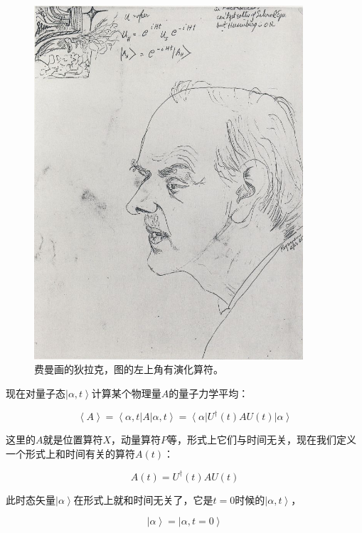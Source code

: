 \begin{figure}[htbp]
\begin{center}
\includegraphics[width=10cm]{Spin/DbyF.jpg}
\caption{费曼画的狄拉克，图的左上角有演化算符。}
\end{center}
\end{figure}

现在对量子态$\left| \alpha, t \right\rangle$计算某个物理量$A$的量子力学平均：

\begin{equation}
\left\langle A \right\rangle = \left\langle \alpha, t \right| A \left| \alpha, t \right\rangle = \left\langle \alpha \right| U^\dagger(t) A U(t) \left| \alpha \right\rangle
\end{equation}

这里的$A$就是位置算符$X$，动量算符$P$等，形式上它们与时间无关，现在我们定义一个形式上和时间有关的算符$A(t)$：

\begin{equation}
A(t) = U^\dagger (t ) A U(t)
\end{equation}

此时态矢量$\left| \alpha \right\rangle$在形式上就和时间无关了，它是$t=0$时候的$\left| \alpha, t \right\rangle$，

\begin{equation}
\left| \alpha \right\rangle = \left| \alpha, t = 0 \right\rangle
\end{equation}

